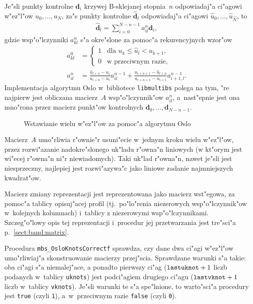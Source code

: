 Je"sli punkty kontrolne $\bm{d}_i$ krzywej B-sklejanej
stopnia~$n$ odpowiadaj"a ci"agowi w"ez"l"ow $u_0,\ldots,\allowbreak u_N$,
za"s punkty kontrolne $\hat{\bm{d}}_l$ odpowiadaj"a ci"agowi
$\hat{u}_0,\ldots,\hat{u}_{\hat{N}}$, to
\begin{align}
  \hat{\bm{d}}_l = \sum_{i=0}^{N-n-1}a_{il}^n\bm{d}_i,
\end{align}
gdzie wsp"o"lczynniki $a^{n}_{kl}$ s"a okre"slone za pomoc"a rekurencyjnych
wzor"ow
\begin{align}\label{eq:Oslo:0}
  a^0_{kl} &{}= \left\{\begin{array}{ll}1 & \mbox{dla $u_k\leq \hat{u}_l<u_{k+1}$,} \\
    0 & \mbox{w przeciwnym razie,} \end{array}\right. \\
  \label{eq:Oslo:j}
  a^n_{il} &{}= \frac{\hat{u}_{l+n}-u_i}{u_{i+n}-u_i} a^{n-1}_{il} +
    \frac{u_{i+n+1}-\hat{u}_{l+n}}{u_{i+n+1}-u_{i+1}} a^{n-1}_{i+1,l}.
\end{align}
Implementacja algorytmu Oslo w~bibliotece \texttt{libmultibs} polega na tym,
"re najpierw jest obliczana macierz~$A$ wsp"o"lczynnik"ow
$a^n_{il}$, a~nast"epnie jest ona mno"rona przez macierz punkt"ow
kontrolnych $\bm{d}_0,\ldots,\bm{d}_{N-n-1}$.
\begin{figure}[htb]
  \centerline{}
  \caption{Wstawianie wielu w"ez"l"ow za pomoc"a algorytmu Oslo}
\end{figure}

Macierz~$A$ umo"rliwia r"ownie"r usuni"ecie
w~jednym kroku wielu w"ez"l"ow, przez rozwi"azanie nadokre"slonego uk"ladu
r"owna"n liniowych (w kt"orym jest wi"ecej r"owna"n ni"r niewiadomych).
Taki uk"lad r"owna"n, nawet je"sli jest niesprzeczny, najlepiej jest
rozwi"azywa"c jako liniowe zadanie najmniejszych kwadrat"ow.

Macierz zmiany reprezentacji jest reprezentowana jako macierz wst"egowa, za
pomoc"a tablicy opisuj"acej profil (tj.\ po"lo"renia niezerowych
wsp"o"lczynnik"ow w~kolejnych kolumnach) i~tablicy z niezerowymi
wsp"o"lczynnikami. Szczeg"o"lowy opis tej reprezentacji i~procedur jej
przetwarzania jest tre"sci"a p.~\ref{sect:band:matrix}.

\vspace{\bigskipamount}
\begin{sloppypar}
Procedura \texttt{mbs\_OsloKnotsCorrectf} sprawdza, czy dane dwa ci"agi
w"ez"l"ow umo"rliwiaj"a skonstruowanie macierzy przej"scia. Sprawdzane
warunki s"a takie: oba ci"agi s"a niemalej"ace, a ponadto pierwszy ci"ag
($\mathord{\mbox{\texttt{lastuknot}}}+1$ liczb podanych w~tablicy
\texttt{uknots}) jest podci"agiem drugiego ci"agu
($\mathord{\mbox{\texttt{lastvknot}}}+1$ liczb w~tablicy
\texttt{vknots}). Je"sli warunki te s"a spe"lnione, to warto"sci"a procedury
jest \texttt{true} (czyli \texttt{1}), a~w~przeciwnym razie \texttt{false}
(czyli \texttt{0}).
\end{sloppypar}

